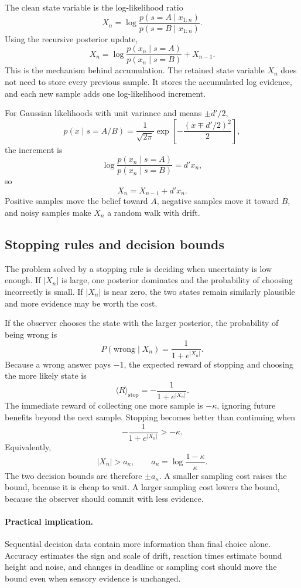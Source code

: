 The clean state variable is the log-likelihood ratio
\[
  X_n
  =
  \log
  \frac{p(s=A\mid x_{1:n})}{p(s=B\mid x_{1:n})}.
\]
Using the recursive posterior update,
\[
  X_n
  =
  \log
  \frac{p(x_n\mid s=A)}{p(x_n\mid s=B)}
  +
  X_{n-1}.
\]
This is the mechanism behind accumulation. The retained state variable \(X_n\) does not need to store every previous sample. It stores the accumulated log evidence, and each new sample adds one log-likelihood increment.

For Gaussian likelihoods with unit variance and means \(\pm d'/2\),
\[
  p(x\mid s=A/B)
  =
  \frac{1}{\sqrt{2\pi}}
  \exp\!\left[-\frac{(x\mp d'/2)^2}{2}\right],
\]
the increment is
\[
  \log\frac{p(x_n\mid s=A)}{p(x_n\mid s=B)}
  =
  d'x_n,
\]
so
\[
  X_n=X_{n-1}+d'x_n.
\]
Positive samples move the belief toward \(A\), negative samples move it toward \(B\), and noisy samples make \(X_n\) a random walk with drift.

\subsection{Stopping rules and decision bounds}

The problem solved by a stopping rule is deciding when uncertainty is low enough. If \(|X_n|\) is large, one posterior dominates and the probability of choosing incorrectly is small. If \(|X_n|\) is near zero, the two states remain similarly plausible and more evidence may be worth the cost.

If the observer chooses the state with the larger posterior, the probability of being wrong is
\[
  P(\mathrm{wrong}\mid X_n)
  =
  \frac{1}{1+e^{|X_n|}}.
\]
Because a wrong answer pays \(-1\), the expected reward of stopping and choosing the more likely state is
\[
  \langle R\rangle_{\mathrm{stop}}
  =
  -\frac{1}{1+e^{|X_n|}}.
\]
The immediate reward of collecting one more sample is \(-\kappa\), ignoring future benefits beyond the next sample. Stopping becomes better than continuing when
\[
  -\frac{1}{1+e^{|X_n|}}
  >
  -\kappa.
\]
Equivalently,
\[
  |X_n|
  >
  a_\kappa,
  \qquad
  a_\kappa
  =
  \log\frac{1-\kappa}{\kappa}.
\]
The two decision bounds are therefore \(\pm a_\kappa\). A smaller sampling cost raises the bound, because it is cheap to wait. A larger sampling cost lowers the bound, because the observer should commit with less evidence.

\paragraph{Practical implication.}
Sequential decision data contain more information than final choice alone. Accuracy estimates the sign and scale of drift, reaction times estimate bound height and noise, and changes in deadline or sampling cost should move the bound even when sensory evidence is unchanged.

